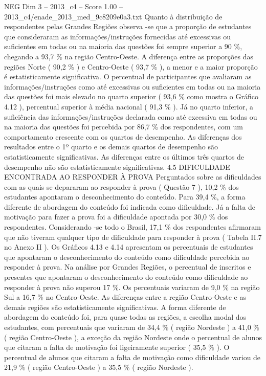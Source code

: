 \begin{textsample}{NEG Dim 3 – 2013\_c4 – Score 1.00 – 2013\_c4/enade\_2013\_med\_9c8209e0a3.txt}
Quanto à distribuição de respondentes pelas Grandes Regiões observa -se que a proporção de estudantes que consideraram as informações/instruções fornecidas até excessivas ou suficientes em todas ou na maioria das questões foi sempre superior a 90 \%, chegando a 93,7 \% na região Centro-Oeste.
A diferença entre as proporções das regiões Norte ( 90,2 \% ) e Centro-Oeste ( 93,7 \% ), a menor e a maior proporção é estatisticamente significativa.
O percentual de participantes que avaliaram as informações/instruções como até excessivas ou suficientes em todas ou na maioria das questões foi mais elevado no quarto superior ( 93,6 \% como mostra o Gráfico 4.12 ), percentual superior à média nacional ( 91,3 \% ).
Já no quarto inferior, a suficiência das informações/instruções declarada como até excessiva em todas ou na maioria das questões foi percebida por 86,7 \% dos respondentes, com um comportamento crescente com os quartos de desempenho.
As diferenças dos resultados entre o 1º quarto e os demais quartos de desempenho são estatisticamente significativas.
As diferenças entre os últimos três quartos de desempenho não são estatisticamente significativas. 4.5 DIFICULDADE ENCONTRADA AO RESPONDER À PROVA Perguntados sobre as dificuldades com as quais se depararam ao responder à prova ( Questão 7 ), 10,2 \% dos estudantes apontaram o desconhecimento do conteúdo.
Para 39,4 \%, a forma diferente de abordagem do conteúdo foi indicada como dificuldade.
Já a falta de motivação para fazer a prova foi a dificuldade apontada por 30,0 \% dos respondentes.
Considerando -se todo o Brasil, 17,1 \% dos respondentes afirmaram que não tiveram qualquer tipo de dificuldade para responder à prova ( Tabela II.7 no Anexo II ).
Os Gráficos 4.13 e 4.14 apresentam os percentuais de estudantes que apontaram o desconhecimento do conteúdo como dificuldade percebida ao responder à prova.
Na análise por Grandes Regiões, o percentual de inscritos e presentes que apontaram o desconhecimento do conteúdo como dificuldade ao responder à prova não superou 17 \%.
Os percentuais variaram de 9,0 \% na região Sul a 16,7 \% no Centro-Oeste.
As diferenças entre a região Centro-Oeste e as demais regiões são estatisticamente significativas.
A forma diferente de abordagem do conteúdo foi, para quase todas as regiões, a escolha modal dos estudantes, com percentuais que variaram de 34,4 \% ( região Nordeste ) a 41,0 \% ( região Centro-Oeste ), a exceção da região Nordeste onde o percentual de alunos que citaram a falta de motivação foi ligeiramente superior ( 35,5 \% ).
O percentual de alunos que citaram a falta de motivação como dificuldade variou de 21,9 \% ( região Centro-Oeste ) a 35,5 \% ( região Nordeste ).

\end{textsample}

